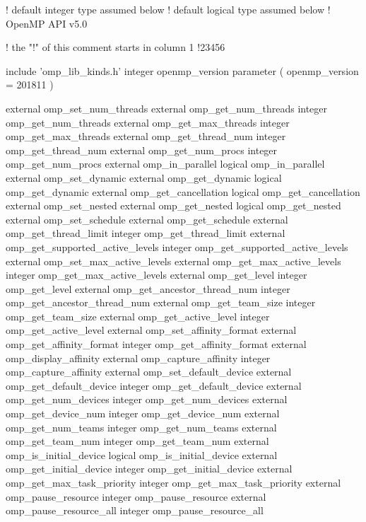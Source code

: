 {\small \begin{ompfSyntax}
! default integer type assumed below
! default logical type assumed below
! OpenMP API v5.0

!      the "!" of this comment starts in column 1
!23456

      include 'omp_lib_kinds.h'
      integer openmp_version
      parameter ( openmp_version = 201811 )

      external omp_set_num_threads
      external omp_get_num_threads
      integer omp_get_num_threads
      external omp_get_max_threads
      integer omp_get_max_threads
      external omp_get_thread_num
      integer omp_get_thread_num
      external omp_get_num_procs
      integer omp_get_num_procs
      external omp_in_parallel
      logical omp_in_parallel
      external omp_set_dynamic
      external omp_get_dynamic
      logical omp_get_dynamic
      external omp_get_cancellation
      logical omp_get_cancellation
      external omp_set_nested
      external omp_get_nested
      logical omp_get_nested
      external omp_set_schedule
      external omp_get_schedule
      external omp_get_thread_limit
      integer omp_get_thread_limit
      external omp_get_supported_active_levels
      integer omp_get_supported_active_levels
      external omp_set_max_active_levels
      external omp_get_max_active_levels
      integer omp_get_max_active_levels
      external omp_get_level
      integer omp_get_level
      external omp_get_ancestor_thread_num
      integer omp_get_ancestor_thread_num
      external omp_get_team_size
      integer omp_get_team_size
      external omp_get_active_level
      integer omp_get_active_level
      external omp_set_affinity_format
      external omp_get_affinity_format
      integer omp_get_affinity_format
      external omp_display_affinity
      external omp_capture_affinity
      integer omp_capture_affinity
      external omp_set_default_device
      external omp_get_default_device
      integer omp_get_default_device
      external omp_get_num_devices
      integer omp_get_num_devices
      external omp_get_device_num
      integer omp_get_device_num
      external omp_get_num_teams
      integer omp_get_num_teams
      external omp_get_team_num
      integer omp_get_team_num
      external omp_is_initial_device
      logical omp_is_initial_device
      external omp_get_initial_device
      integer omp_get_initial_device
      external omp_get_max_task_priority
      integer omp_get_max_task_priority
      external omp_pause_resource
      integer omp_pause_resource
      external omp_pause_resource_all
      integer omp_pause_resource_all


\end{ompfSyntax}}
